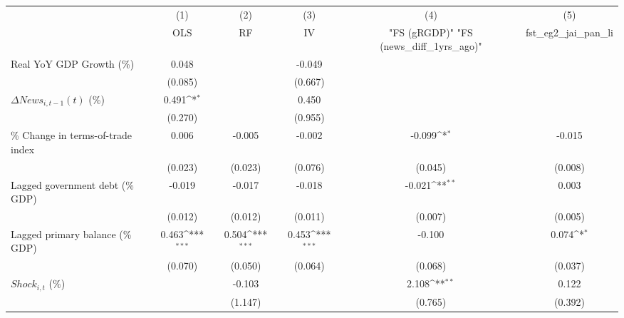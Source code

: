 {
\def\sym#1{\ifmmode^{#1}\else\(^{#1}\)\fi}
\begin{tabular}{l*{5}{c}}
\toprule
                    &\multicolumn{1}{c}{(1)}&\multicolumn{1}{c}{(2)}&\multicolumn{1}{c}{(3)}&\multicolumn{1}{c}{(4)}&\multicolumn{1}{c}{(5)}\\
                    &\multicolumn{1}{c}{OLS}&\multicolumn{1}{c}{RF}&\multicolumn{1}{c}{IV}&\multicolumn{1}{c}{ "FS (gRGDP)"  "FS (news_diff_1yrs_ago)" }&\multicolumn{1}{c}{fst_eg2_jai_pan_li}\\
\midrule
Real YoY GDP Growth (\%)&       0.048         &                     &      -0.049         &                     &                     \\
                    &     (0.085)         &                     &     (0.667)         &                     &                     \\
\addlinespace
$ \Delta News_{i,t-1}(t)$ (\%)&       0.491\sym{*}  &                     &       0.450         &                     &                     \\
                    &     (0.270)         &                     &     (0.955)         &                     &                     \\
\addlinespace
\% Change in terms-of-trade index&       0.006         &      -0.005         &      -0.002         &      -0.099\sym{*}  &      -0.015         \\
                    &     (0.023)         &     (0.023)         &     (0.076)         &     (0.045)         &     (0.008)         \\
\addlinespace
Lagged government debt (\% GDP)&      -0.019         &      -0.017         &      -0.018         &      -0.021\sym{**} &       0.003         \\
                    &     (0.012)         &     (0.012)         &     (0.011)         &     (0.007)         &     (0.005)         \\
\addlinespace
Lagged primary balance (\% GDP)&       0.463\sym{***}&       0.504\sym{***}&       0.453\sym{***}&      -0.100         &       0.074\sym{*}  \\
                    &     (0.070)         &     (0.050)         &     (0.064)         &     (0.068)         &     (0.037)         \\
\addlinespace
$ Shock_{i,t}$ (\%) &                     &      -0.103         &                     &       2.108\sym{**} &       0.122         \\
                    &                     &     (1.147)         &                     &     (0.765)         &     (0.392)         \\

\end{tabular}}
